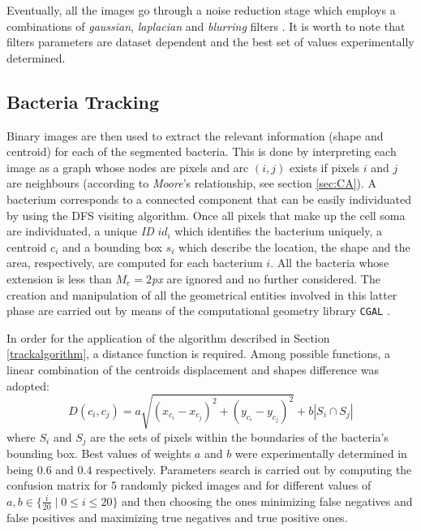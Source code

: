 Eventually, all the images go through a noise reduction stage which employs a combinations of \textit{gaussian}, \textit{laplacian} and \textit{blurring} filters \cite{Deng:1993}.
It is worth to note that filters parameters are dataset dependent and the best set of values experimentally determined. 



\subsection{Bacteria Tracking}

Binary images are then used to extract the relevant information (shape and centroid) for each of the segmented bacteria.
This is done by interpreting each image as a graph whose nodes are pixels and arc $(i,j)$ exists if pixels $i$ and $j$ are neighbours (according to \textit{Moore}'s relationship, see section \ref{sec:CA}).
A bacterium corresponds to a connected component that can be easily individuated by using the DFS visiting algorithm.
Once all pixels that make up the cell soma are individuated, a unique \textit{ID} $id_i$ which identifies the bacterium uniquely, a centroid $c_i$ and a bounding box $s_i$ which describe the location, the shape and the area, respectively, are computed for each bacterium $i$. All the bacteria whose extension is less than $M_e = 2$\textit{px} are ignored and no further considered.
The creation and manipulation of all the geometrical entities involved in this latter phase are carried out by means of the computational geometry library \texttt{CGAL}  \cite{CGAL}.

In order for the application of the algorithm described in Section \ref{trackalgorithm}, a distance function is required.
Among possible functions, a linear combination of the centroids displacement and shapes difference was adopted:
\begin{equation}
\label{sec:bacttracking}
D(c_i,c_j) = a \sqrt{(x_{c_i} - x_{c_j})^2 + (y_{c_i}-y_{c_j})^2} + b |S_i \cap S_j|
\end{equation}
where $S_i$ and $S_j$ are the sets of pixels within the boundaries of the bacteria's  bounding box. Best values of weights $a$ and $b$ were experimentally determined in being $0.6$ and $0.4$ respectively. 
Parameters search is carried out by computing the confusion matrix for 5 randomly picked images and for different values of $a,b \in \{\frac{i}{20}\;|\;0\leq i \leq 20\}$ and then choosing the ones minimizing false negatives and false positives and maximizing true negatives and true positive ones. 

